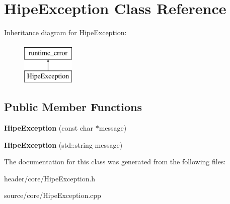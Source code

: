 \hypertarget{class_hipe_exception}{}\section{Hipe\+Exception Class Reference}
\label{class_hipe_exception}
Inheritance diagram for Hipe\+Exception\+:\begin{figure}[H]
\begin{center}
\leavevmode
\includegraphics[height=2.000000cm]{d8/d9d/class_hipe_exception}
\end{center}
\end{figure}
\subsection*{Public Member Functions}
\begin{DoxyCompactItemize}
\item 
\mbox{\label{class_hipe_exception_a61865350797373de27a596f09abc17b0}} 
{\bfseries Hipe\+Exception} (const char $\ast$message)
\item 
\mbox{\label{class_hipe_exception_a61e2d2fb080e9f8926b3620cf7559c37}} 
{\bfseries Hipe\+Exception} (std\+::string message)
\end{DoxyCompactItemize}


The documentation for this class was generated from the following files\+:\begin{DoxyCompactItemize}
\item 
header/core/Hipe\+Exception.\+h\item 
source/core/Hipe\+Exception.\+cpp\end{DoxyCompactItemize}
